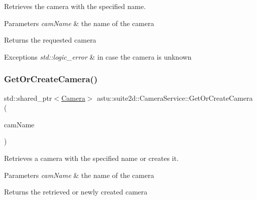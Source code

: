 Retrieves the camera with the specified name.


\begin{DoxyParams}{Parameters}
{\em cam\+Name} & the name of the camera \\
\hline
\end{DoxyParams}
\begin{DoxyReturn}{Returns}
the requested camera 
\end{DoxyReturn}

\begin{DoxyExceptions}{Exceptions}
{\em std\+::logic\+\_\+error} & in case the camera is unknown \\
\hline
\end{DoxyExceptions}
\mbox{\label{classastu_1_1suite2d_1_1CameraService_aacd4b3d010851ebc0d3cce0453f87624}} 
\subsubsection{\texorpdfstring{Get\+Or\+Create\+Camera()}{GetOrCreateCamera()}}
{\footnotesize\ttfamily std\+::shared\+\_\+ptr$<$\hyperlink{classastu_1_1suite2d_1_1Camera}{Camera}$>$ astu\+::suite2d\+::\+Camera\+Service\+::\+Get\+Or\+Create\+Camera (\begin{DoxyParamCaption}\item[{const std\+::string \&}]{cam\+Name }\end{DoxyParamCaption})\hspace{0.3cm}{\ttfamily [inline]}}

Retrieves a camera with the specified name or creates it.


\begin{DoxyParams}{Parameters}
{\em cam\+Name} & the name of the camera \\
\hline
\end{DoxyParams}
\begin{DoxyReturn}{Returns}
the retrieved or newly created camera 
\end{DoxyReturn}
\mbox{\label{classastu_1_1suite2d_1_1CameraService_a00f6b9d4898b70f7412efb21acd91271}} 
